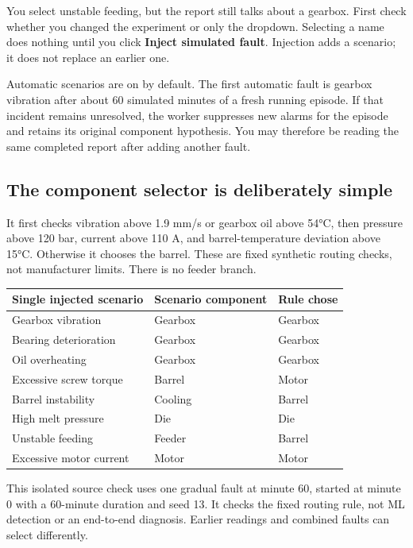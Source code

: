 You select unstable feeding, but the report still talks about a gearbox. First check whether you changed the experiment or only the dropdown. Selecting a name does nothing until you click \textbf{Inject simulated fault}. Injection adds a scenario; it does not replace an earlier one.

Automatic scenarios are on by default. The first automatic fault is gearbox vibration after about 60 simulated minutes of a fresh running episode. If that incident remains unresolved, the worker suppresses new alarms for the episode and retains its original component hypothesis. You may therefore be reading the same completed report after adding another fault.

\subsection*{The component selector is deliberately simple}
It first checks vibration above 1.9 mm/s or gearbox oil above 54°C, then pressure above 120 bar, current above 110 A, and barrel-temperature deviation above 15°C. Otherwise it chooses the barrel. These are fixed synthetic routing checks, not manufacturer limits. There is no feeder branch.

\begin{tabularx}{\linewidth}{@{}Xll@{}}\toprule
Single injected scenario & Scenario component & Rule chose\\\midrule
Gearbox vibration & Gearbox & Gearbox\\
Bearing deterioration & Gearbox & Gearbox\\
Oil overheating & Gearbox & Gearbox\\
Excessive screw torque & Barrel & Motor\\
Barrel instability & Cooling & Barrel\\
High melt pressure & Die & Die\\
Unstable feeding & Feeder & Barrel\\
Excessive motor current & Motor & Motor\\\bottomrule
\end{tabularx}
\par{\raggedright\small This isolated source check uses one gradual fault at minute 60, started at minute 0 with a 60-minute duration and seed 13. It checks the fixed routing rule, not ML detection or an end-to-end diagnosis. Earlier readings and combined faults can select differently.\par}

